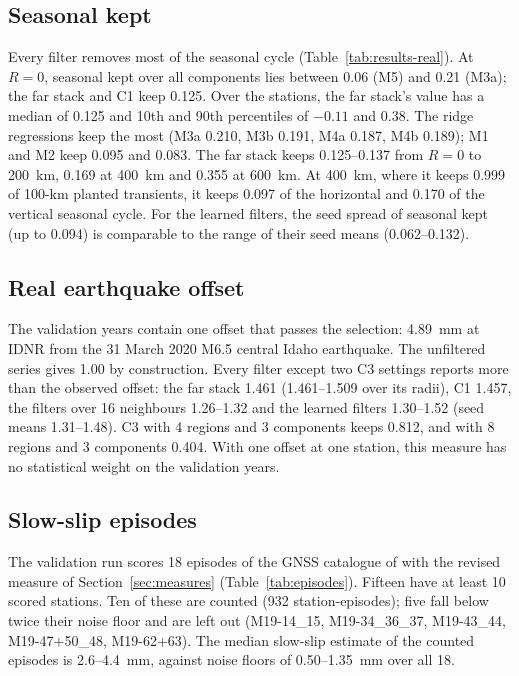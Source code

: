 \documentclass[preprint,12pt,authoryear]{elsarticle}
\begin{document}
\subsection{Seasonal kept}
\label{sec:res-seasonal}

Every filter removes most of the seasonal cycle (Table~\ref{tab:results-real}). At $R = 0$, seasonal kept over all components lies between 0.06 (M5) and 0.21 (M3a); the far stack and C1 keep 0.125. Over the stations, the far stack's value has a median of 0.125 and 10th and 90th percentiles of $-0.11$ and 0.38. The ridge regressions keep the most (M3a 0.210, M3b 0.191, M4a 0.187, M4b 0.189); M1 and M2 keep 0.095 and 0.083. The far stack keeps 0.125--0.137 from $R = 0$ to 200~km, 0.169 at 400~km and 0.355 at 600~km. At 400~km, where it keeps 0.999 of 100-km planted transients, it keeps 0.097 of the horizontal and 0.170 of the vertical seasonal cycle. For the learned filters, the seed spread of seasonal kept (up to 0.094) is comparable to the range of their seed means (0.062--0.132).

\subsection{Real earthquake offset}
\label{sec:res-offsets}

The validation years contain one offset that passes the selection: 4.89~mm at IDNR from the 31 March 2020 M6.5 central Idaho earthquake. The unfiltered series gives 1.00 by construction. Every filter except two C3 settings reports more than the observed offset: the far stack 1.461 (1.461--1.509 over its radii), C1 1.457, the filters over 16 neighbours 1.26--1.32 and the learned filters 1.30--1.52 (seed means 1.31--1.48). C3 with 4 regions and 3 components keeps 0.812, and with 8 regions and 3 components 0.404. With one offset at one station, this measure has no statistical weight on the validation years.

\subsection{Slow-slip episodes}
\label{sec:res-episodes}

The validation run scores 18 episodes of the GNSS catalogue of \citet{michel2019} with the revised measure of Section~\ref{sec:measures} (Table~\ref{tab:episodes}). Fifteen have at least 10 scored stations. Ten of these are counted (932 station-episodes); five fall below twice their noise floor and are left out (M19-14\_15, M19-34\_36\_37, M19-43\_44, M19-47+50\_48, M19-62+63). The median slow-slip estimate of the counted episodes is 2.6--4.4~mm, against noise floors of 0.50--1.35~mm over all 18.
\end{document}
